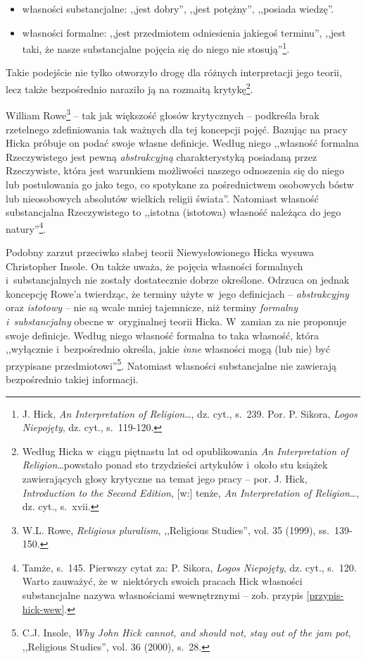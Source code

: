 \begin{itemize}
\item własności substancjalne: ,,jest dobry'', ,,jest potężny'', ,,posiada wiedzę''.
\item własności formalne: ,,jest przedmiotem odniesienia jakiegoś terminu'', ,,jest taki, że nasze substancjalne pojęcia się do niego nie stosują''\footnote{J. Hick, \textit{An Interpretation of Religion}\ldots, dz. cyt., s.~239. Por. P. Sikora, \textit{Logos Niepojęty}, dz. cyt., s.~119-120.}.
\end{itemize}
Takie podejście nie tylko otworzyło drogę dla różnych interpretacji jego teorii, lecz także bezpośrednio naraziło ją na rozmaitą krytykę\footnote{Według Hicka w~ciągu piętnastu lat od opublikowania \textit{An Interpretation of Religion}\ldots powstało ponad sto trzydzieści artykułów i~około stu książek zawierających głosy krytyczne na temat jego pracy -- por. J. Hick, \textit{Introduction to the Second Edition}, [w:] tenże, \textit{An Interpretation of Religion}\ldots, dz. cyt., s.~xvii.}.

William Rowe\footnote{W.L. Rowe, \textit{Religious pluralism}, ,,Religious Studies'', vol. 35 (1999), ss.~139-150.} -- tak jak większość głosów krytycznych -- podkreśla brak rzetelnego zdefiniowania tak ważnych dla tej koncepcji pojęć. Bazując na pracy Hicka próbuje on podać swoje własne definicje. Według niego ,,własność formalna Rzeczywistego jest pewną \textit{abstrakcyjną} charakterystyką posiadaną przez Rzeczywiste, która jest warunkiem możliwości naszego odnoszenia się do niego lub postulowania go jako tego, co spotykane za pośrednictwem osobowych bóstw lub nieosobowych absolutów wielkich religii świata''. Natomiast własność substancjalna Rzeczywistego to ,,istotna (istotowa) własność należąca do jego natury''\footnote{Tamże, s.~145. Pierwszy cytat za: P. Sikora, \textit{Logos Niepojęty}, dz. cyt., s.~120. Warto zauważyć, że w~niektórych swoich pracach Hick własności substancjalne nazywa własnościami wewnętrznymi -- zob. przypis \ref{przypis-hick-wew}.}.

Podobny zarzut przeciwko słabej teorii Niewysłowionego Hicka wysuwa Christopher Insole. On także uważa, że pojęcia własności formalnych i~substancjalnych nie zostały dostatecznie dobrze określone. Odrzuca on jednak koncepcję Rowe'a twierdząc, że terminy użyte w~jego definicjach -- \textit{abstrakcyjny} oraz \textit{istotowy} -- nie są wcale mniej tajemnicze, niż terminy \textit{formalny i~substancjalny} obecne w~oryginalnej teorii Hicka. W~zamian za nie proponuje swoje definicje. Według niego własność formalna to taka własność, która ,,wyłącznie i~bezpośrednio określa, jakie \textit{inne} własności mogą (lub nie) być przypisane przedmiotowi''\footnote{C.J. Insole, \textit{Why John Hick cannot, and should not, stay out of the jam pot}, ,,Religious Studies'', vol. 36 (2000), s.~28.}. Natomiast własności substancjalne nie zawierają bezpośrednio takiej informacji.

